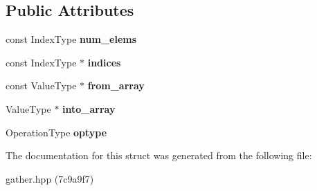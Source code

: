 \subsection*{Public Attributes}
\begin{DoxyCompactItemize}
\item 
\mbox{\label{structschwz_1_1Gather_a9c16149747d5a4c77c061d750a27faf2}} 
const Index\+Type {\bfseries num\+\_\+elems}
\item 
\mbox{\label{structschwz_1_1Gather_a8adc05f74bac862e80eae9e5bcd6918d}} 
const Index\+Type $\ast$ {\bfseries indices}
\item 
\mbox{\label{structschwz_1_1Gather_ae45f6ecca9f53252e804c6de1b96f4dd}} 
const Value\+Type $\ast$ {\bfseries from\+\_\+array}
\item 
\mbox{\label{structschwz_1_1Gather_a2edcfcb6bb277db9273a3865a4c2f017}} 
Value\+Type $\ast$ {\bfseries into\+\_\+array}
\item 
\mbox{\label{structschwz_1_1Gather_a8830fdf0a3d07abb1d985fa4cb42bb08}} 
Operation\+Type {\bfseries optype}
\end{DoxyCompactItemize}


The documentation for this struct was generated from the following file\+:\begin{DoxyCompactItemize}
\item 
gather.\+hpp (7c9a9f7)\end{DoxyCompactItemize}
